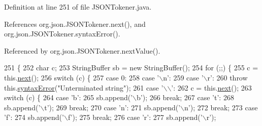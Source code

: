 Definition at line 251 of file J\-S\-O\-N\-Tokener.\-java.



References org.\-json.\-J\-S\-O\-N\-Tokener.\-next(), and org.\-json.\-J\-S\-O\-N\-Tokener.\-syntax\-Error().



Referenced by org.\-json.\-J\-S\-O\-N\-Tokener.\-next\-Value().


\begin{DoxyCode}
251                                                               \{
252         \textcolor{keywordtype}{char} c;
253         StringBuffer sb = \textcolor{keyword}{new} StringBuffer();
254         \textcolor{keywordflow}{for} (;;) \{
255             c = this.\hyperlink{classorg_1_1json_1_1_j_s_o_n_tokener_ae129753dbe43ea50aa34e3c06773fdfb}{next}();
256             \textcolor{keywordflow}{switch} (c) \{
257             \textcolor{keywordflow}{case} 0:
258             \textcolor{keywordflow}{case} \textcolor{charliteral}{'\(\backslash\)n'}:
259             \textcolor{keywordflow}{case} \textcolor{charliteral}{'\(\backslash\)r'}:
260                 \textcolor{keywordflow}{throw} this.\hyperlink{classorg_1_1json_1_1_j_s_o_n_tokener_a467f559950c039f28394ce3a0d2659ca}{syntaxError}(\textcolor{stringliteral}{"Unterminated string"});
261             \textcolor{keywordflow}{case} \textcolor{charliteral}{'\(\backslash\)\(\backslash\)'}:
262                 c = this.\hyperlink{classorg_1_1json_1_1_j_s_o_n_tokener_ae129753dbe43ea50aa34e3c06773fdfb}{next}();
263                 \textcolor{keywordflow}{switch} (c) \{
264                 \textcolor{keywordflow}{case} \textcolor{charliteral}{'b'}:
265                     sb.append(\textcolor{charliteral}{'\(\backslash\)b'});
266                     \textcolor{keywordflow}{break};
267                 \textcolor{keywordflow}{case} \textcolor{charliteral}{'t'}:
268                     sb.append(\textcolor{charliteral}{'\(\backslash\)t'});
269                     \textcolor{keywordflow}{break};
270                 \textcolor{keywordflow}{case} \textcolor{charliteral}{'n'}:
271                     sb.append(\textcolor{charliteral}{'\(\backslash\)n'});
272                     \textcolor{keywordflow}{break};
273                 \textcolor{keywordflow}{case} \textcolor{charliteral}{'f'}:
274                     sb.append(\textcolor{charliteral}{'\(\backslash\)f'});
275                     \textcolor{keywordflow}{break};
276                 \textcolor{keywordflow}{case} \textcolor{charliteral}{'r'}:
277                     sb.append(\textcolor{charliteral}{'\(\backslash\)r'});

\end{DoxyCode}
